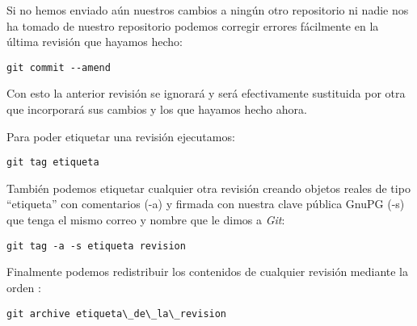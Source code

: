 Si no hemos enviado aún nuestros cambios a ningún otro repositorio ni
nadie nos ha tomado de nuestro repositorio podemos corregir errores
fácilmente en la última revisión que hayamos hecho:

\begin{lstlisting}[style=consola]
  git commit --amend
\end{lstlisting}

Con esto la anterior revisión se ignorará y será efectivamente
sustituida por otra que incorporará sus cambios y los que hayamos
hecho ahora.

Para poder etiquetar una revisión ejecutamos:
\begin{lstlisting}[style=consola]
  git tag etiqueta
\end{lstlisting}

También podemos etiquetar cualquier otra revisión creando objetos
reales de tipo ``etiqueta'' con comentarios (-a) y firmada con nuestra
clave pública GnuPG (-s) que tenga el mismo correo y nombre que le
dimos a \textit{Git}:

\begin{lstlisting}[style=consola]
  git tag -a -s etiqueta revision
\end{lstlisting}

Finalmente podemos redistribuir los contenidos de cualquier revisión
mediante la orden :

\begin{lstlisting}[style=consola]
  git archive etiqueta\_de\_la\_revision
\end{lstlisting}


